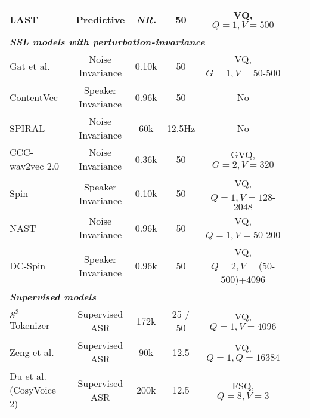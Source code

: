 \begin{table}[]
{\begin{tabular}{@{}lcccccc@{}}
LAST~\cite{turetzky2024last} & {Predictive} & \textit{NR.} & 50 & VQ, $Q=1,V=500$ \\
\midrule
\multicolumn{5}{l}{\textbf{\textit{SSL models with perturbation-invariance}}} \\
{Gat et al.~\cite{gat2023augmentation}} & Noise Invariance & 0.10k & 50 & VQ, $G=1,V=50$-$500$  \\
ContentVec~\cite{qian2022contentvec} & Speaker Invariance & 0.96k & 50 & No \\
SPIRAL~\cite{huang2022spiral} & Noise Invariance & 60k & 12.5Hz & No\\
CCC-wav2vec 2.0~\cite{ccc-wav2vec2.0} & Noise Invariance & 0.36k & 50 & GVQ, $G=2,V=320$ \\
Spin~\cite{chang23_interspeech} & Speaker Invariance & 0.10k & 50 & VQ, $Q=1,V=128$-$2048$\\
NAST~\cite{messica2024nast} & Noise Invariance & 0.96k & 50 & VQ, $Q=1,V=50$-$200$\\
DC-Spin~\cite{chang2024dc} & Speaker Invariance & 0.96k & 50 & VQ, $Q=2,V=(50$-$500)$+$4096$ \\
\midrule
\multicolumn{5}{l}{\textbf{\textit{Supervised models}}} \\
$\mathcal S^3$ Tokenizer~\cite{du2024cosyvoice}  & Supervised ASR & 172k & 25 / 50  & VQ, $Q=1,V=4096$ \\
Zeng et al.~\cite{zeng2024scaling} & Supervised ASR & 90k & 12.5 & VQ, $Q=1,Q=16384$ \\
Du et al. \scriptsize{(CosyVoice 2)}~\cite{cosyvoice2} & Supervised ASR & 200k & 12.5 & FSQ, $Q=8,V=3$ \\
\bottomrule
\end{tabular}
}
\vspace{-0.15in}
\end{table}

\IEEEpubidadjcol

